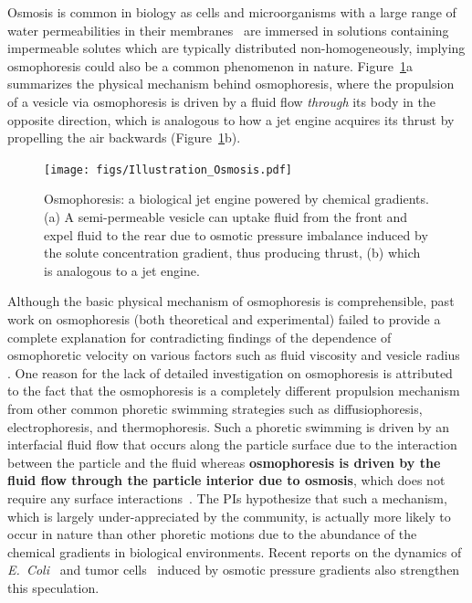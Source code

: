 \documentclass[11pt]{article}
\begin{document}
Osmosis is common in biology as cells and microorganisms with a large
range of water permeabilities in their membranes~\cite{deamer1986,
finkelstein1976, lawaczeck1979} are immersed in solutions containing
impermeable solutes which are typically distributed non-homogeneously,
implying osmophoresis could also be a common phenomenon in nature.
Figure~\ref{fig:illustration}a summarizes the physical mechanism behind
osmophoresis, where the propulsion of a vesicle via osmophoresis is
driven by a fluid flow {\em through} its body in the opposite direction,
which is analogous to how a jet engine acquires its thrust by propelling
the air backwards (Figure~\ref{fig:illustration}b). 
\begin{figure}[h]
\begin{center}
\texttt{[image: figs/Illustration\_Osmosis.pdf]}
\caption{Osmophoresis: a biological jet engine powered by chemical
  gradients. (a) A semi-permeable vesicle can uptake fluid from the
  front and expel fluid to the rear due to osmotic pressure imbalance
  induced by the solute concentration gradient, thus producing thrust,
  (b) which is analogous to a jet engine.}
\label{fig:illustration}
\end{center}
\end{figure}

Although the basic physical mechanism of osmophoresis is comprehensible,
past work on osmophoresis (both theoretical and experimental) failed to
provide a complete explanation for contradicting findings of the
dependence of osmophoretic velocity on various factors such as fluid
viscosity and vesicle radius~\cite{anderson1983, anderson1986,
gordon1981, nardi1999} .  One reason for the lack of
detailed investigation on osmophoresis is attributed to the fact that
the osmophoresis is a completely different propulsion mechanism from
other common phoretic swimming strategies such as diffusiophoresis,
electrophoresis, and thermophoresis. Such a phoretic swimming is driven
by an interfacial fluid flow that occurs along the particle surface due
to the interaction between the particle and the fluid whereas {\bf
osmophoresis is driven by the fluid flow through the particle interior
due to osmosis}, which does not require any surface
interactions~\cite{anderson1986,anderson1989}. The PIs hypothesize that
such a mechanism, which is largely under-appreciated by the community,
is actually more likely to occur in nature than other phoretic motions
due to the abundance of the chemical gradients in biological
environments. Recent reports on the dynamics of {\em
E.~Coli}~\cite{rosko2017} and tumor cells~\cite{stroka2014} induced by
osmotic pressure gradients also strengthen this speculation. 
\end{document}

